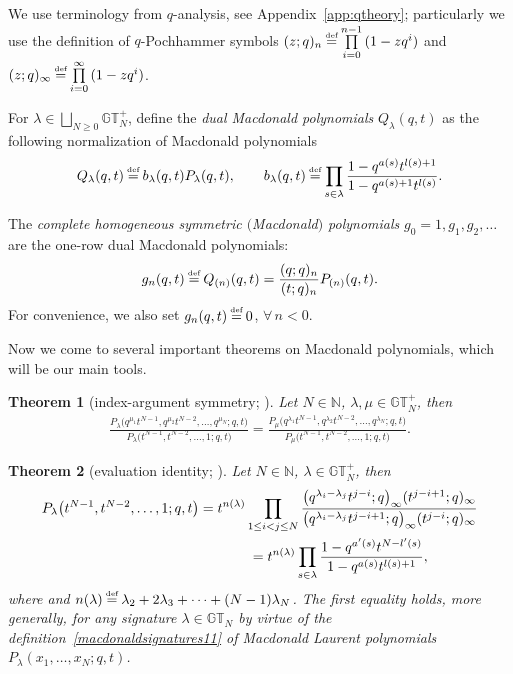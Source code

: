 \documentclass[pdftex]{sigma}
\numberwithin{equation}{section}
\newcommand\myeq{\mathrel{\stackrel{\makebox[0pt]{\mbox{\normalfont\tiny def}}}{=}}}
\newtheorem{thm}{Theorem}[section]
\newcommand{\N}{\mathbb{N}}
\newcommand{\GT}{\mathbb{GT}}
\newcommand{\GTp}{\mathbb{GT}^+}
\begin{document}
We use terminology from $q$-analysis, see Appendix~\ref{app:qtheory}; particularly we use the def\/inition of $q$-Pochhammer symbols $(z; q)_n \myeq \prod\limits_{i=0}^{n-1}{(1 - zq^i)}$ and $(z; q)_{\infty} \myeq \prod\limits_{i=0}^{\infty}{(1 - zq^i)}$.

For $\lambda\in\bigsqcup\limits_{N\geq 0}{\GTp_N}$, def\/ine the \textit{dual Macdonald polynomials} $Q_{\lambda}(q, t)$ as the following normaliza\-tion of Macdonald polynomials
\begin{gather}\label{PtoQ}
Q_{\lambda}(q, t) \myeq b_{\lambda}(q, t)P_{\lambda}(q, t), \qquad b_{\lambda}(q, t) \myeq \prod_{s\in\lambda}{\frac{1 - q^{a(s)}t^{l(s) + 1}}{1 - q^{a(s) + 1}t^{l(s)}}}.
\end{gather}

The \textit{complete homogeneous symmetric $($Macdonald$)$ polynomials} $g_0 = 1, g_1, g_2, \dots$ are the one-row dual Macdonald polynomials:
\begin{gather}\label{gtoQ}
g_n(q, t) \myeq Q_{(n)}(q, t) = \frac{(q; q)_n}{(t; q)_n}P_{(n)}(q, t).
\end{gather}
For convenience, we also set $g_n(q, t) \myeq 0$, $\forall\, n < 0$.

Now we come to several important theorems on Macdonald polynomials, which will be our main tools.

\begin{thm}[{index-argument symmetry; \cite[Chapter~VI, Property~6.6]{M2}}]\label{symmetry}
Let $N\in\N$, $\lambda, \mu\in\GTp_N$, then
\begin{gather*}
\frac{P_{\lambda}\big(q^{\mu_1}t^{N-1}, q^{\mu_2}t^{N-2}, \dots, q^{\mu_N}; q, t\big)}{P_{\lambda}\big(t^{N-1}, t^{N-2}, \dots, 1; q, t\big)} = \frac{P_{\mu}\big(q^{\lambda_1}t^{N-1}, q^{\lambda_2}t^{N-2}, \dots, q^{\lambda_N}; q, t\big)}{P_{\mu}\big(t^{N-1}, t^{N-2}, \dots, 1; q, t\big)}.
\end{gather*}
\end{thm}

\begin{thm}[{evaluation identity; \cite[Chapter~VI, equations~(6.11) and~(6.11$'$)]{M2}}]\label{evaluation}
Let $N\in\N$, $\lambda\in\GTp_N$, then
\begin{gather*}
P_{\lambda}\big(t^{N-1}, t^{N-2}, \dots, 1; q, t\big) = t^{n(\lambda)}\prod_{1\leq i<j\leq N}{\frac{\big(q^{\lambda_i - \lambda_j}t^{j-i}; q\big)_{\infty}(t^{j-i+1}; q)_{\infty} }{ \big(q^{\lambda_i - \lambda_j}t^{j-i+1}; q\big)_{\infty} (t^{j-i}; q)_{\infty}}}\\
\hphantom{P_{\lambda}\big(t^{N-1}, t^{N-2}, \dots, 1; q, t\big)}{} = t^{n(\lambda)}\prod_{s\in\lambda}{\frac{1 - q^{a'(s)}t^{N - l'(s)}}{1 - q^{a(s)}t^{l(s)+1}}},
\end{gather*}
where and $n(\lambda) \myeq \lambda_2 + 2\lambda_3 + \cdots + (N-1)\lambda_N$.
The first equality holds, more generally, for any signature $\lambda\in\GT_N$ by virtue of the definition~\eqref{macdonaldsignatures11} of Macdonald Laurent polynomials $P_{\lambda}(x_1, \dots, x_N; q, t)$.
\end{thm}
\end{document}
